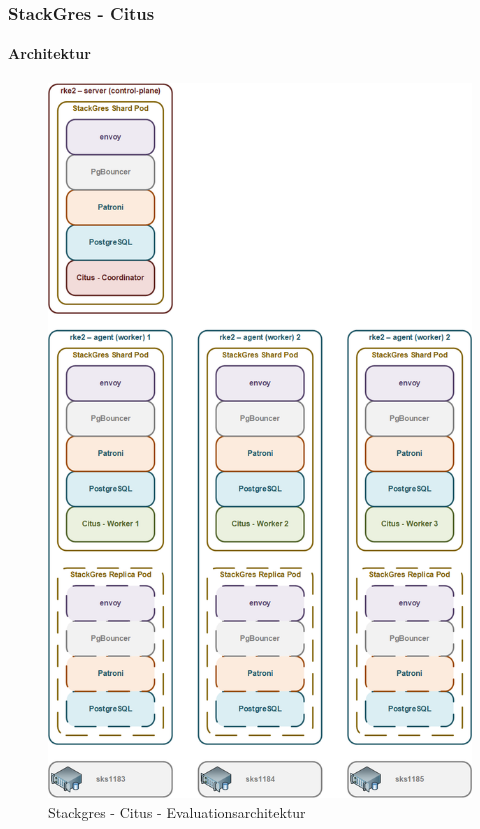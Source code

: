 
\begin{flushleft}
    \subsubsection{StackGres - Citus}
    \paragraph{Architektur}
    \begin{figure}[H]
        \centering
        \includegraphics[width=0.8\linewidth]{source/implementation/evaluation/postgresql_ha_solutions/stackgres/stackgres-citus-evaluation-architecture}
        \caption{Stackgres - Citus - Evaluationsarchitektur}
        \label{fig:stackgres-citus-evaluation-architecture}
    \end{figure}
\end{flushleft}